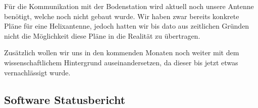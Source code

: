 Für die Kommunikation mit der Bodenstation wird aktuell noch unsere Antenne benötigt, welche noch nicht gebaut wurde. Wir haben zwar bereits konkrete Pläne für eine Helixantenne, jedoch hatten wir bis dato aus zeitlichen Gründen nicht die Möglichkeit diese Pläne in die Realität zu übertragen.

Zusätzlich wollen wir uns in den kommenden Monaten noch weiter mit dem wissenschaftlichem Hintergrund auseinandersetzen, da dieser bis jetzt etwas vernachlässigt wurde.

\subsection{Software Statusbericht}
